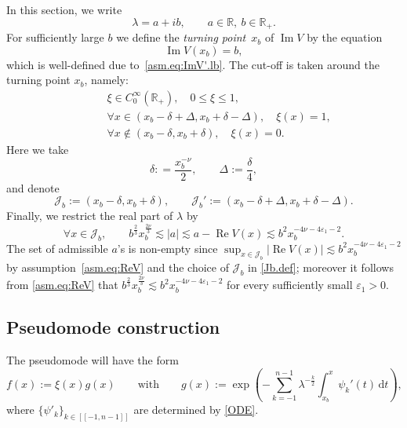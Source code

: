 In this section, we write
\begin{equation}\label{lam.ab.def}
\lambda = a + i b, \qquad a \in {\mathbb{R}}, \ b \in {\mathbb{R}}_+.
\end{equation} 
For sufficiently large $b$ we define 
the \emph{turning point}~$x_b$ of ${\operatorname{Im}} V$ by the equation
\begin{equation}\label{xb.def}
{\operatorname{Im}} V(x_b) = b,
\end{equation}
which is well-defined due to~\eqref{asm.eq:ImV'.lb}.
The cut-off is taken around the turning point $x_b$, namely:
\begin{equation}\label{xi.def.gen}
\begin{aligned}
& \xi \in C_0^\infty({\mathbb{R}}_+), \quad 0 \leq \xi \leq 1, 
\\
&\forall x \in (x_b-\delta+\Delta, x_b + \delta-\Delta), \quad \xi(x) =1,  
\\
\qquad 
& \forall x \notin (x_b-\delta,x_b + \delta), \quad \xi(x)=0. 
\end{aligned}
\end{equation}
Here we take
\begin{equation}\label{delta.def.gen}
\delta: =\frac{x_b^{- \nu}}2, \qquad \Delta := \frac{\delta}{4},
\end{equation}
and denote
\begin{equation}\label{Jb.def}
{\mathcal J}_b:=(x_b-\delta,x_b + \delta), \qquad
{\mathcal J}_b':=(x_b-\delta + \Delta, x_b + \delta -\Delta ).	
\end{equation}
Finally, we restrict the real part of $\lambda$ by
\begin{equation}\label{a.gen}
\forall x \in {\mathcal J}_b, \qquad  
b^\frac 23 x_b^\frac{2\nu}3 {\lesssim} |a|  {\lesssim} a- {\operatorname{Re}} V(x) {\lesssim} b^2 x_b^{-4\nu -4 {\varepsilon}_1-2}.
\end{equation}
The set of admissible $a$'s is non-empty since $\sup_{x \in {\mathcal J}_b} |{\operatorname{Re}} V(x)| {\lesssim} b^2 x_b^{-4\nu -4 {\varepsilon}_1-2}$ by assumption~\eqref{asm.eq:ReV} and the choice of ${\mathcal J}_b$ in \eqref{Jb.def}; moreover it follows from \eqref{asm.eq:ReV} that  $b^\frac 23 x_b^\frac{2\nu}3 {\lesssim} b^2 x_b^{-4\nu -4 {\varepsilon}_1-2}$ for every sufficiently small ${\varepsilon}_1>0$.

\subsection{Pseudomode construction}
The pseudomode will have the form
\begin{equation}\label{mode.def.gen}
f(x) := \xi(x) g(x) 
\qquad\mbox{with}\qquad
g(x) :=
\exp \left(- \sum_{k=-1}^{n-1} \lambda^{-\frac k2} \int_{x_b}^x   \psi_{k}'(t) \, {\mathrm{d}} t \right),
\end{equation}
where $\{\psi'_k\}_{k\in[[-1,n-1]]}$ are determined by \eqref{ODE}.

